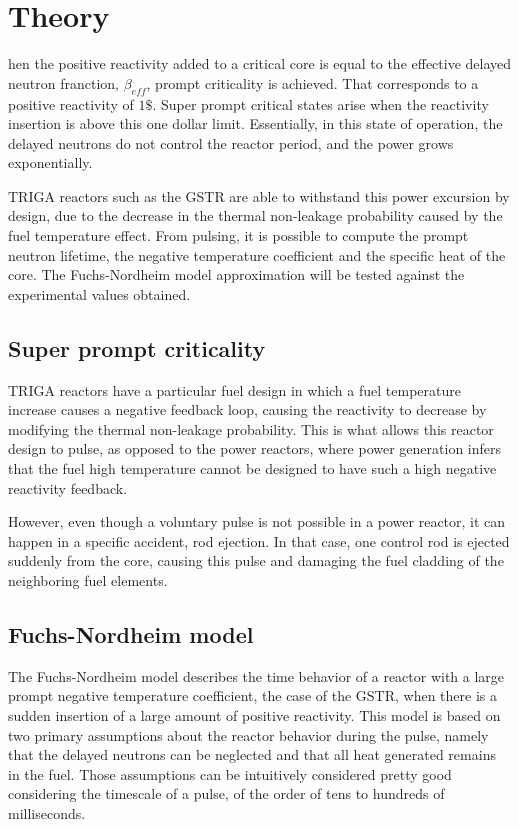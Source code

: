 %
%
\let\textcircled=\pgftextcircled
\chapter{Theory}
\label{chap:intro}

hen the positive reactivity added to a critical core is equal to the effective delayed neutron franction, $\beta_{eff}$, prompt criticality is achieved. That corresponds to a positive reactivity of $1\$$. Super prompt critical states arise when the reactivity insertion is above this one dollar limit. Essentially, in this state of operation, the delayed neutrons do not control the reactor period, and the power grows exponentially.

TRIGA reactors such as the GSTR are able to withstand this power excursion by design, due to the decrease in the thermal non-leakage probability caused by the fuel temperature effect. From pulsing, it is possible to compute the prompt neutron lifetime, the negative temperature coefficient and the specific heat of the core. The Fuchs-Nordheim model approximation will be tested against the experimental values obtained.

\section{Super prompt criticality}

TRIGA reactors have a particular fuel design in which a fuel temperature increase causes a negative feedback loop, causing the reactivity to decrease by modifying the thermal non-leakage probability. This is what allows this reactor design to pulse, as opposed to the power reactors, where power generation infers that the fuel high temperature cannot be designed to have such a high negative reactivity feedback.

However, even though a voluntary pulse is not possible in a power reactor, it can happen in a specific accident, rod ejection. In that case, one control rod is ejected suddenly from the core, causing this pulse and damaging the fuel cladding of the neighboring fuel elements.

\section{Fuchs-Nordheim model}

The Fuchs-Nordheim model describes the time behavior of a reactor with a large prompt negative temperature coefficient, the case of the GSTR, when there is a sudden insertion of a large amount of positive reactivity. This model is based on two primary assumptions about the reactor behavior during the pulse, namely that the delayed neutrons can be neglected and that all heat generated remains in the fuel. Those assumptions can be intuitively considered pretty good considering the timescale of a pulse, of the order of tens to hundreds of milliseconds.

